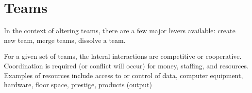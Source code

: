 
\section{Teams}

In the context of altering teams, there are a few major levers available: create new team, merge teams, dissolve a team. 

For a given set of teams, the lateral interactions are competitive or cooperative. Coordination is required (or conflict will occur) for money, staffing, and resources. Examples of resources include access to or control of data, computer equipment, hardware, floor space, prestige, products (output)